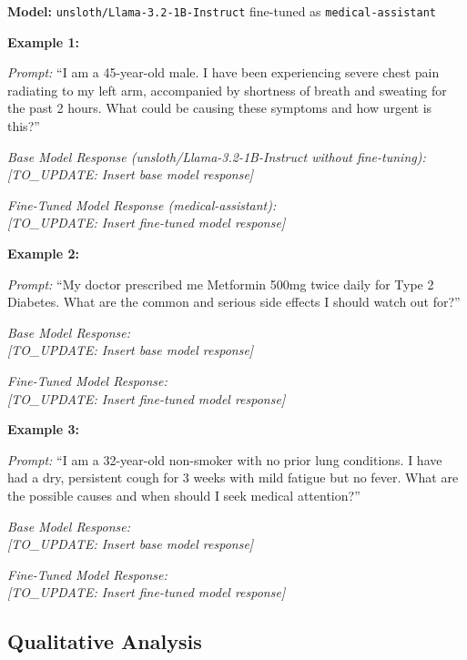 \documentclass[11pt,a4paper]{article}
\begin{document}
\textbf{Model:} \texttt{unsloth/Llama-3.2-1B-Instruct} fine-tuned as \texttt{medical-assistant}

\textbf{Example 1:}

\textit{Prompt:} ``I am a 45-year-old male. I have been experiencing severe chest pain radiating to my left arm, accompanied by shortness of breath and sweating for the past 2 hours. What could be causing these symptoms and how urgent is this?''

\textit{Base Model Response (unsloth/Llama-3.2-1B-Instruct without fine-tuning):}\\
\hspace*{1em}\textit{[TO\_UPDATE: Insert base model response]}

\textit{Fine-Tuned Model Response (medical-assistant):}\\
\hspace*{1em}\textit{[TO\_UPDATE: Insert fine-tuned model response]}

\vspace{0.5em}
\textbf{Example 2:}

\textit{Prompt:} ``My doctor prescribed me Metformin 500mg twice daily for Type 2 Diabetes. What are the common and serious side effects I should watch out for?''

\textit{Base Model Response:}\\
\hspace*{1em}\textit{[TO\_UPDATE: Insert base model response]}

\textit{Fine-Tuned Model Response:}\\
\hspace*{1em}\textit{[TO\_UPDATE: Insert fine-tuned model response]}

\vspace{0.5em}
\textbf{Example 3:}

\textit{Prompt:} ``I am a 32-year-old non-smoker with no prior lung conditions. I have had a dry, persistent cough for 3 weeks with mild fatigue but no fever. What are the possible causes and when should I seek medical attention?''

\textit{Base Model Response:}\\
\hspace*{1em}\textit{[TO\_UPDATE: Insert base model response]}

\textit{Fine-Tuned Model Response:}\\
\hspace*{1em}\textit{[TO\_UPDATE: Insert fine-tuned model response]}

\subsection{Qualitative Analysis}
\end{document}
